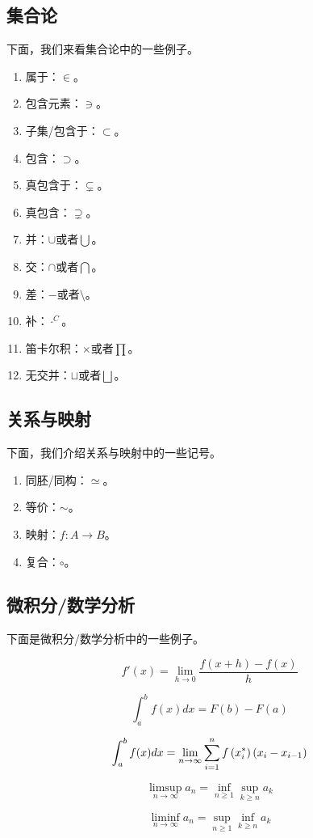 \subsection{集合论}
下面，我们来看集合论中的一些例子。
\begin{enumerate}
    \item 属于：$\in$。
    \item 包含元素：$\ni$。
    \item 子集/包含于：$\subset$。
    \item 包含：$\supset$。
    \item 真包含于：$\subsetneq$。
    \item 真包含：$\supsetneq$。
    \item 并：$\cup$或者$\bigcup$。
    \item 交：$\cap$或者$\bigcap$。
    \item 差：$-$或者$\setminus$。
    \item 补：$\cdot^C$。
    \item 笛卡尔积：$\times$或者$\prod$。
    \item 无交并：$\sqcup$或者$\bigsqcup$。
\end{enumerate}

\subsection{关系与映射}
下面，我们介绍关系与映射中的一些记号。
\begin{enumerate}
    \item 同胚/同构：$\simeq$。
    \item 等价：$\sim$。
    \item 映射：$f:A\to B$。
    \item 复合：$\circ$。
\end{enumerate}


\subsection{微积分/数学分析}
下面是微积分/数学分析中的一些例子。

\[  f'(x)=\lim_{h\to 0}\frac{f(x+h)-f(x)}{h} \]

\[  \int_a^bf(x)dx=F(b)-F(a) \]

\[ \int_a^bf(x)dx=\lim_{n\to \infty }\sum_{i=1}^n f\left(x_i^*\right)\left(x_i-x_{i-1}\right)     \]

\[  \limsup_{n\to \infty}a_n=\inf_{n\ge 1}\sup_{k\ge n}a_k   \]

\[  \liminf_{n\to \infty}a_n=\sup_{n\ge 1}\inf_{k\ge n}a_k   \]

